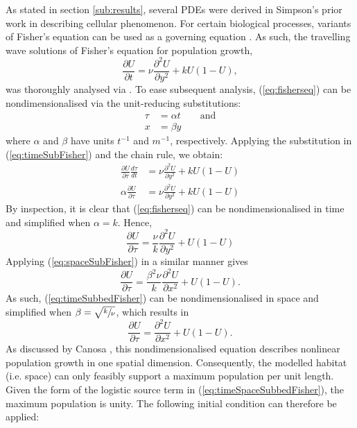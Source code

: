 \documentclass[11pt,titlepage,a4paper]{article}
\begin{document}
		As stated in section \ref{sub:results}, several PDEs were derived in Simpson's prior work in describing cellular phenomenon. For certain biological processes, variants of Fisher's equation can be used as a governing equation \cite{simpson2009diffusing}. As such, the travelling wave solutions of Fisher's equation for population growth,
		\begin{equation}
			 \label{eq:fisherseq}
			 \frac{\partial U}{\partial t} = \nu \frac{\partial^2 U}{\partial y^2} + k U (1 - U),
		\end{equation}
		was thoroughly analysed via \cite{canosa1973nonlinear}. To ease subsequent analysis, (\ref{eq:fisherseq}) can be nondimensionalised via the unit-reducing substitutions:
		\begin{align}
			 \label{eq:timeSubFisher}
			 \tau &= \alpha t \qquad \text{and} \\
			 \label{eq:spaceSubFisher} 
			 x &= \beta y
		\end{align}
		where $\alpha$ and $\beta$ have units $t^{-1}$ and $m^{-1}$, respectively. Applying the substitution in (\ref{eq:timeSubFisher}) and the chain rule, we obtain:
		\begin{align*}
			 \frac{\partial U}{\partial \tau} \frac{d \tau}{d t} &= \nu \frac{\partial^2 U}{\partial y^2} + k U (1 - U) \\ 
			 \alpha \frac{\partial U}{\partial \tau} &= \nu \frac{\partial^2 U}{\partial y^2} + k U (1 - U)
		\end{align*}
		By inspection, it is clear that (\ref{eq:fisherseq}) can be nondimensionalised in time and simplified when $\alpha = k$. Hence,
		\begin{equation}
			 \label{eq:timeSubbedFisher}
			 \frac{\partial U}{\partial \tau} = \frac{\nu}{k} \frac{\partial^2 U}{\partial y^2} + U (1 - U)
		\end{equation}
		Applying (\ref{eq:spaceSubFisher}) in a similar manner gives
		\begin{equation*}
			 \frac{\partial U}{\partial \tau} = \frac{\beta^2 \nu}{k} \frac{\partial^2 U}{\partial x^2} + U (1 - U).
		\end{equation*}
		As such, (\ref{eq:timeSubbedFisher}) can be nondimensionalised in space and simplified when $\beta = \sqrt{\sfrac{k}{\nu}}$, which results in
		\begin{equation}
			 \label{eq:timeSpaceSubbedFisher}
			 \frac{\partial U}{\partial \tau} = \frac{\partial^2 U}{\partial x^2} + U (1 - U).
		\end{equation}
		As discussed by Canosa \cite{canosa1973nonlinear}, this nondimensionalised equation describes nonlinear population growth in one spatial dimension. Consequently, the modelled habitat (i.e. space) can only feasibly support a maximum population per unit length. Given the form of the logistic source term in (\ref{eq:timeSpaceSubbedFisher}), the maximum population is unity. The following initial condition can therefore be applied:
\end{document}
